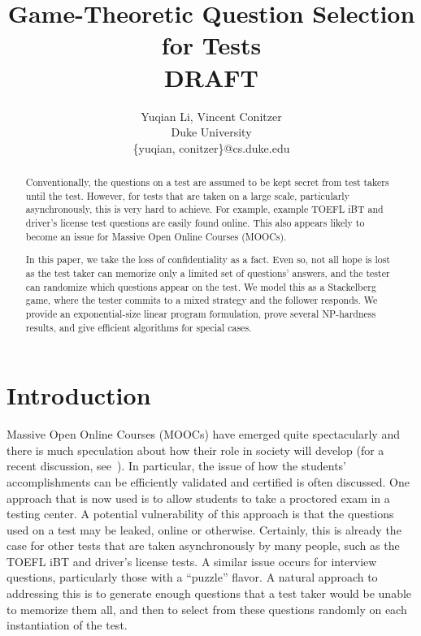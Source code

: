 \documentclass{article}
\title{Game-Theoretic Question Selection for Tests\\DRAFT}
\author{Yuqian Li, Vincent Conitzer\\
Duke University\\
\{yuqian, conitzer\}@cs.duke.edu}
\begin{document}
\maketitle

\begin{abstract}
Conventionally, the questions on a test are assumed to be kept secret
from test takers until the test.  However, for tests that are taken on
a large scale, particularly asynchronously, this is very hard to
achieve.  For example, example TOEFL iBT and driver's license test
questions are easily found online.  This also appears likely to become
an issue for Massive Open Online Courses (MOOCs).

In this paper, we take the loss of confidentiality as a fact.  Even
so, not all hope is lost as the test taker can memorize only a limited
set of questions' answers, and the tester can randomize which questions appear on
the test.  We model this as a Stackelberg game, where the tester
commits to a mixed strategy and the follower responds.  We provide an
exponential-size linear program formulation, prove several NP-hardness
results, and give efficient algorithms for special cases.
\end{abstract}

\section{Introduction}
Massive Open Online Courses (MOOCs) have emerged quite spectacularly
and there is much speculation about how their role in society will
develop (for a recent discussion, see~\cite{Cooper13:Reflections}).
In particular, the issue of how the students' accomplishments can be
efficiently validated and certified is often discussed.  One approach
that is now used is to allow students to take a proctored exam in a
testing center.  A potential vulnerability of this approach is that
the questions used on a test may be leaked, online or otherwise.
Certainly, this is already the case for other tests that are taken
asynchronously by many people, such as the TOEFL iBT and driver's
license tests.  A similar issue occurs for interview questions,
particularly those with a ``puzzle'' flavor.  A natural approach to
addressing this is to generate enough questions that a test taker
would be unable to memorize them all, and then to select from these
questions randomly on each instantiation of the test.
\end{document}
